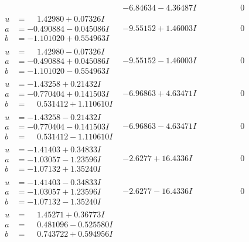 \documentclass[1p]{elsarticle_modified}
\theoremstyle{definition}
\begin{document}
$$\begin{array}{c|c|c}
 & -6.84634 - 4.36487 I & \phantom{-0.000000 } 0 \\ \hline\begin{aligned}
u &= \phantom{-}1.42980 + 0.07326 I \\
a &= -0.490884 - 0.045086 I \\
b &= -1.101020 + 0.554963 I\end{aligned}
 & -9.55152 + 1.46003 I & \phantom{-0.000000 } 0 \\ \hline\begin{aligned}
u &= \phantom{-}1.42980 - 0.07326 I \\
a &= -0.490884 + 0.045086 I \\
b &= -1.101020 - 0.554963 I\end{aligned}
 & -9.55152 - 1.46003 I & \phantom{-0.000000 } 0 \\ \hline\begin{aligned}
u &= -1.43258 + 0.21432 I \\
a &= -0.770404 + 0.141503 I \\
b &= \phantom{-}0.531412 + 1.110610 I\end{aligned}
 & -6.96863 + 4.63471 I & \phantom{-0.000000 } 0 \\ \hline\begin{aligned}
u &= -1.43258 - 0.21432 I \\
a &= -0.770404 - 0.141503 I \\
b &= \phantom{-}0.531412 - 1.110610 I\end{aligned}
 & -6.96863 - 4.63471 I & \phantom{-0.000000 } 0 \\ \hline\begin{aligned}
u &= -1.41403 + 0.34833 I \\
a &= -1.03057 - 1.23596 I \\
b &= -1.07132 + 1.35240 I\end{aligned}
 & -2.6277 + 16.4336 I & \phantom{-0.000000 } 0 \\ \hline\begin{aligned}
u &= -1.41403 - 0.34833 I \\
a &= -1.03057 + 1.23596 I \\
b &= -1.07132 - 1.35240 I\end{aligned}
 & -2.6277 - 16.4336 I & \phantom{-0.000000 } 0 \\ \hline\begin{aligned}
u &= \phantom{-}1.45271 + 0.36773 I \\
a &= \phantom{-}0.481096 - 0.525580 I \\
b &= \phantom{-}0.743722 + 0.594956 I\end{aligned}

\end{array}$$
\end{document}
